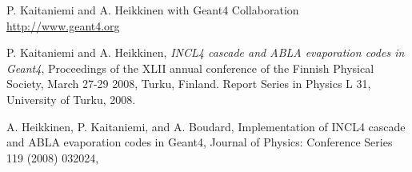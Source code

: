 \documentclass[12pt]{article}
\begin{document}

\begin{thebibliography}{9}

P. Kaitaniemi and A. Heikkinen with Geant4 Collaboration
\href{http://www.geant4.org}{http://www.geant4.org}

P. Kaitaniemi and A. Heikkinen,  
{\em INCL4 cascade and ABLA evaporation codes in Geant4},
Proceedings of the XLII annual conference of the Finnish Physical Society, 
                 March 27-29 2008, Turku, Finland. 
                 Report Series in Physics L 31, University of Turku, 2008.

A. Heikkinen, P. Kaitaniemi, and A. Boudard,
Implementation of INCL4 cascade and ABLA evaporation codes in Geant4,
Journal of Physics: Conference Series 119 (2008) 032024, 
{\sf [doi:10.1088/1742-6596/119/3/032024]}

\end{thebibliography}
\end{document}
